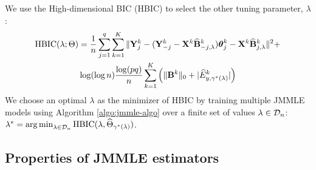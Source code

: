 We use the High-dimensional BIC (HBIC) to select the other tuning parameter, $\lambda$:
%
\begin{align*}
\text{HBIC} (\lambda; \Theta) &=
\frac{1}{n} \sum_{j=1}^q \sum_{k=1}^K \| {\mathbf{Y}}^k_j - ({\mathbf{Y}}_{-j}^k - {\mathbf{X}}^k \widehat {{\mathbf{B}}}_{-j,\lambda}^k ) {\boldsymbol{\theta}}_j^{k } - {\mathbf{X}}^k \widehat {{\mathbf{B}}}_{j,\lambda}^k \|^2 +\\
& \log (\log n) \frac{\log (pq)}{n} \sum_{k=1}^K
\left( \| {\mathbf{B}}^k \|_0 + | \widehat E_{y, \gamma^* (\lambda)}^k| \right)
\end{align*}
%
We choose an optimal $\lambda$ as the minimizer of HBIC by training multiple JMMLE models using Algorithm \ref{algo:jmmle-algo} over a finite set of values $\lambda \in {\cal{D}}_n$: 
$
\lambda^* = \operatorname*{arg\,min}_{\lambda \in {\cal{D}}_n} \text{HBIC} (\lambda, \widehat \Theta_{\gamma^*(\lambda)})
$.

%
%
%

%

\subsection{Properties of JMMLE estimators}

